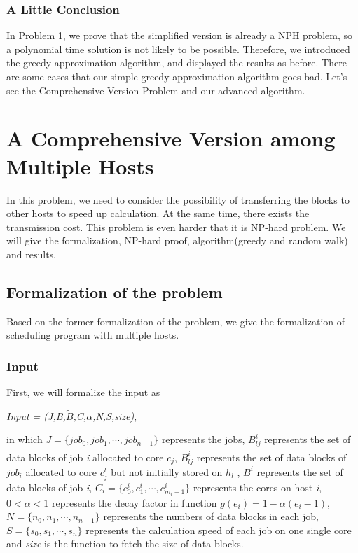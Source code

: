 \documentclass{article}
\begin{document}
\subsubsection{A Little Conclusion}
In Problem 1, we prove that the simplified version is already a NPH problem, so a polynomial time solution is not likely to be possible. Therefore, we introduced the greedy approximation algorithm, and displayed the results as before. There are some cases that our simple greedy approximation algorithm goes bad. Let's see the Comprehensive Version Problem and our advanced algorithm.

\section{A Comprehensive Version among Multiple Hosts}
    In this problem, we need to consider the possibility of transferring the blocks to other hosts to speed up calculation. At the same time, there exists the transmission cost. This problem is even harder that it is NP-hard problem. We will give the formalization, NP-hard proof, algorithm(greedy and random walk) and results.
\subsection{Formalization of the problem}
    Based on the former formalization of the problem, we give the formalization of scheduling program with multiple hosts.
   \subsubsection{Input}
    First, we will formalize the input as
    \begin{center}
            \textit{Input = (J,B,$\widetilde{B}$,C,$\alpha$,N,S,size)},
    \end{center}
    
    in which $J=\{ job_0,job_1,\cdots,job_{n-1}\}$ represents the jobs, $B_{lj}^i$ represents the set of data blocks of job \textit{i} allocated to core $c_j$, $\widetilde{B_{lj}^i}$ represents the set of data blocks of $job_i$ allocated to core $c_j^l$ but not initially stored on $h_l$ , $B^i$ represents the set of data blocks of job \textit{i}, $C_i=\{ c_0^i,c_1^i,\cdots,c_{m_i-1}^i\}$ represents the cores on host \textit{i}, $0 < \alpha < 1$ represents the decay factor in function $g(e_i) = 1 - \alpha(e_i - 1)$, $N=\{n_0,n_1,\cdots,n_{n-1}\}$ represents the numbers of data blocks in each job, $S=\{s_0,s_1,\cdots,s_n\}$ represents the calculation speed of each job on one single core and \textit{size} is the function to fetch the size of data blocks.
    
\end{document}
